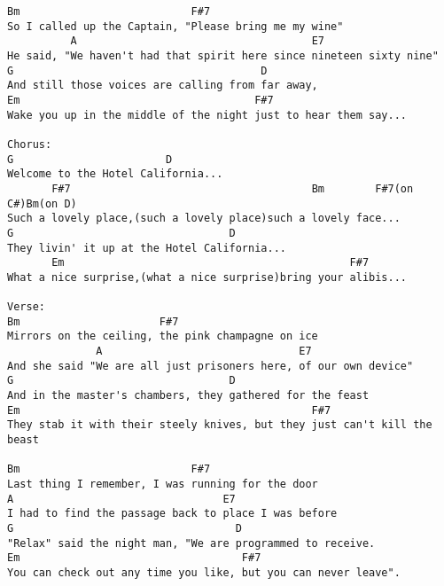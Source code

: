 \documentclass[leqno]{memoir}
\begin{document}
\begin{verbatim}
Bm                           F#7
So I called up the Captain, "Please bring me my wine"
          A                                     E7
He said, "We haven't had that spirit here since nineteen sixty nine"
G                                       D
And still those voices are calling from far away,
Em                                     F#7
Wake you up in the middle of the night just to hear them say...

Chorus:
G                        D 
Welcome to the Hotel California... 
       F#7                                      Bm        F#7(on C#)Bm(on D)
Such a lovely place,(such a lovely place)such a lovely face...
G                                  D
They livin' it up at the Hotel California... 
       Em                                             F#7
What a nice surprise,(what a nice surprise)bring your alibis...

Verse:
Bm                      F#7
Mirrors on the ceiling, the pink champagne on ice
              A                               E7
And she said "We are all just prisoners here, of our own device"
G                                  D
And in the master's chambers, they gathered for the feast
Em                                              F#7
They stab it with their steely knives, but they just can't kill the beast

Bm                           F#7
Last thing I remember, I was running for the door
A                                 E7
I had to find the passage back to place I was before
G                                   D
"Relax" said the night man, "We are programmed to receive.
Em                                   F#7
You can check out any time you like, but you can never leave".

\end{verbatim}
\newpage
\end{document}
